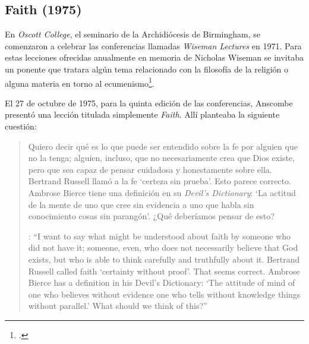 \subsection{Faith (1975)}

En \emph{Oscott College}, el seminario de la Archidiócesis de Birmingham, se comenzaron a celebrar las conferencias llamadas \emph{Wiseman Lectures} en 1971. Para estas lecciones ofrecidas anualmente en memoria de Nicholas Wiseman se invitaba un ponente que tratara algún tema relacionado con la filosofía de la religión o alguna materia en torno al ecumenismo\footnote{\cite[Cf.][7]{wisemanlects}.}.

El 27 de octubre de 1975, para la quinta edición de las conferencias, Anscombe presentó una lección titulada simplemente \emph{Faith}. Allí planteaba la siguiente cuestión: \blockquote[{\Cite[115]{anscombe1981erp:faith}}: \enquote{I want to say what might be understood about faith by someone who did not have it; someone, even, who does not necessarily believe that God exists, but who is able to think carefully and truthfully about it. Bertrand Russell called faith `certainty without proof'. That seems correct. Ambrose Bierce has a definition in his Devil's Dictionary: `The attitude of mind of one who believes without evidence one who tells without knowledge things without parallel.' What should we think of this?}]{Quiero decir qué es lo que puede ser entendido sobre la fe por alguien que no la tenga; alguien, incluso, que no necesariamente crea que Dios existe, pero que sea capaz de pensar cuidadosa y honestamente sobre ella. Bertrand Russell llamó a la fe `certeza sin prueba'. Esto parece correcto. Ambrose Bierce tiene una definición en su \emph{Devil's Dictionary}: `La actitud de la mente de uno que cree sin evidencia a uno que habla sin conocimiento cosas sin parangón'. ¿Qué deberíamos pensar de esto?}

